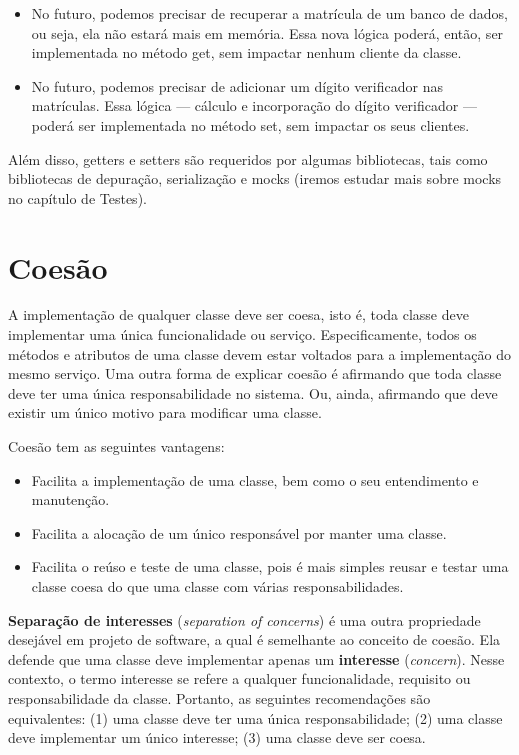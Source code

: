 \documentclass[
  11pt,
  twoside]{book}
\begin{document}
\begin{itemize}
\item
  No futuro, podemos precisar de recuperar a matrícula de um banco de
  dados, ou seja, ela não estará mais em memória. Essa nova lógica
  poderá, então, ser implementada no método get, sem impactar nenhum
  cliente da classe.
\item
  No futuro, podemos precisar de adicionar um dígito verificador nas
  matrículas. Essa lógica --- cálculo e incorporação do dígito
  verificador --- poderá ser implementada no método set, sem impactar os
  seus clientes.
\end{itemize}

Além disso, getters e setters são requeridos por algumas bibliotecas,
tais como bibliotecas de depuração, serialização e mocks (iremos estudar
mais sobre mocks no capítulo de Testes).

\hypertarget{coesuxe3o}{%
\section{Coesão}\label{coesuxe3o}}


A implementação de qualquer classe deve ser coesa, isto é, toda classe
deve implementar uma única funcionalidade ou serviço. Especificamente,
todos os métodos e atributos de uma classe devem estar voltados para a
implementação do mesmo serviço. Uma outra forma de explicar coesão é
afirmando que toda classe deve ter uma única responsabilidade no
sistema. Ou, ainda, afirmando que deve existir um único motivo para
modificar uma classe.

Coesão tem as seguintes vantagens:

\begin{itemize}
\item
  Facilita a implementação de uma classe, bem como o seu entendimento e
  manutenção.
\item
  Facilita a alocação de um único responsável por manter uma classe.
\item
  Facilita o reúso e teste de uma classe, pois é mais simples reusar e
  testar uma classe coesa do que uma classe com várias
  responsabilidades.
\end{itemize}

 \textbf{Separação de interesses}
(\emph{separation of concerns}) é uma outra propriedade desejável em
projeto de software, a qual é semelhante ao conceito de coesão. Ela
defende que uma classe deve implementar apenas um \textbf{interesse}
(\emph{concern}). Nesse contexto, o termo interesse se refere a qualquer
funcionalidade, requisito ou responsabilidade da classe. Portanto, as
seguintes recomendações são equivalentes: (1) uma classe deve ter uma
única responsabilidade; (2) uma classe deve implementar um único
interesse; (3) uma classe deve ser coesa.
\end{document}
